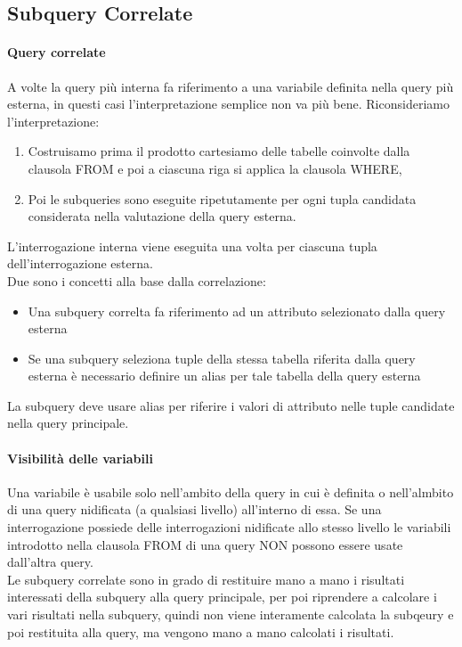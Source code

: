 \subsection{Subquery Correlate}
\paragraph*{Query correlate} A volte la query più interna fa riferimento a una
variabile definita nella query più esterna, in questi casi l'interpretazione semplice non va
più bene. Riconsideriamo l'interpretazione:
\begin{enumerate}
  \item Costruisamo prima il prodotto cartesiamo delle tabelle coinvolte dalla clausola FROM e
  poi a ciascuna riga si applica la clausola WHERE,
  \item Poi le subqueries sono eseguite ripetutamente per ogni tupla candidata considerata
  nella valutazione della query esterna.
\end{enumerate}
L'interrogazione interna viene eseguita una volta per ciascuna tupla dell'interrogazione esterna.\\
Due sono i concetti alla base dalla correlazione:
\begin{itemize}
  \item Una subquery correlta fa riferimento ad un attributo selezionato dalla query esterna
  \item Se una subquery seleziona tuple della stessa tabella riferita dalla query esterna è necessario
  definire un alias per tale tabella della query esterna
\end{itemize}
La subquery deve usare alias per riferire i valori di attributo nelle tuple candidate nella query
principale.
\paragraph*{Visibilità delle variabili} Una variabile è usabile solo nell'ambito della query
in cui è definita o nell'almbito di una query nidificata (a qualsiasi livello) all'interno di essa.
Se una interrogazione possiede delle interrogazioni nidificate allo stesso livello
le variabili introdotto nella clausola FROM di una query NON possono essere usate
dall'altra query.\\
Le subquery correlate sono in grado di restituire mano a mano i risultati interessati
della subquery alla query principale, per poi riprendere a calcolare i vari risultati nella
subquery, quindi non viene interamente calcolata la subqeury e poi restituita alla query, ma vengono
mano a mano calcolati i risultati.
